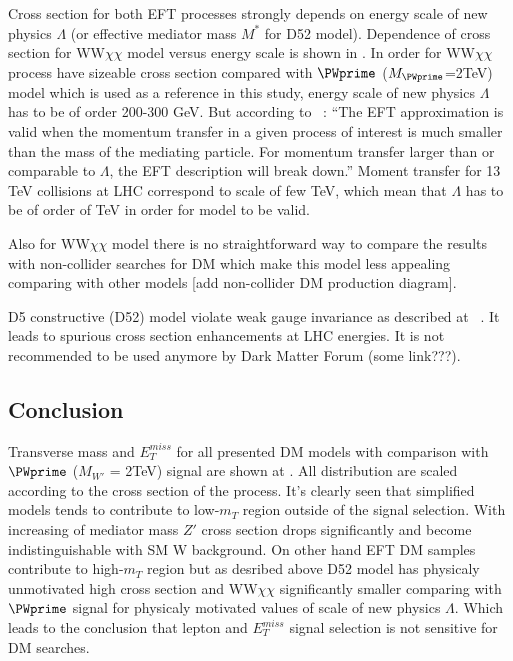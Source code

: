 Cross section for both EFT processes strongly depends on energy scale of new physics $\Lambda$ (or effective mediator mass $M^{*}$ for D52 model).
Dependence of cross section for WW$\chi\chi$ model versus energy scale is shown in .
In order for WW$\chi\chi$ process have sizeable cross section compared with $\PWprime$ ($M_{\PWprime}$=2TeV) model which is used as a reference in this study, 
energy scale of new physics $\Lambda$ has to be of order 200-300 GeV. But according to ~\cite{arXiv:1512.00476}: 
``The EFT approximation is valid when the momentum transfer in a given
process of interest is much smaller than the mass of the mediating
particle. For momentum transfer larger than or comparable to
$\Lambda$, the EFT description will break down.''
Moment transfer for 13 TeV collisions at LHC correspond to scale of few TeV, 
which mean that $\Lambda$ has to be of order of TeV in order for model to be valid.

Also for WW$\chi\chi$ model there is no straightforward way to compare the
results with non-collider searches for DM
which make this model less appealing comparing with other models [add non-collider DM production diagram].

D5 constructive (D52) model violate weak gauge invariance as described at ~\cite{arXiv:1503.07874}.
It leads to spurious cross section enhancements at LHC energies. It is not recommended to be used anymore by Dark Matter Forum (some link???).

\subsection{Conclusion}

Transverse mass and $E_{T}^{miss}$ for all presented DM models with comparison with $\PWprime$ ($M_{W'}$ = 2TeV) signal are shown at .
All distribution are scaled according to the cross section of the process. It's clearly seen that simplified models tends to contribute to low-$m_{T}$ region
outside of the signal selection. With increasing of mediator mass $Z'$ cross section drops significantly and become indistinguishable with SM W background.
On other hand EFT DM samples contribute to high-$m_{T}$ region but as desribed above D52 model has physicaly unmotivated high cross section and WW$\chi\chi$ 
significantly smaller comparing with $\PWprime$ signal for physicaly motivated values of scale of new physics $\Lambda$. Which leads to the conclusion that
lepton and $E_{T}^{miss}$ signal selection is not sensitive for DM searches.



